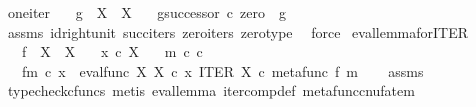 \begin{isabellebody}
\isanewline
{}\isamarkupfalse%
\ one{\isacharunderscore}{\kern0pt}iter{\isacharcolon}{\kern0pt}\isanewline
\ \ \ {\isachardoublequoteopen}g\ {\isacharcolon}{\kern0pt}\ X\ {\isasymrightarrow}\ X{\isachardoublequoteclose}\isanewline
\ \ \ {\isachardoublequoteopen}g\isactrlbsup {\isasymcirc}{\isacharparenleft}{\kern0pt}successor\ {\isasymcirc}\isactrlsub c\ zero{\isacharparenright}{\kern0pt}\isactrlesup \ {\isacharequal}{\kern0pt}\ g{\isachardoublequoteclose}\isanewline
%
\isadelimproof
\ \ %
\endisadelimproof
%
\isatagproof
{}\isamarkupfalse%
\ assms\ id{\isacharunderscore}{\kern0pt}right{\isacharunderscore}{\kern0pt}unit{}\ succ{\isacharunderscore}{\kern0pt}iters\ zero{\isacharunderscore}{\kern0pt}iters\ zero{\isacharunderscore}{\kern0pt}type\ \isamarkupfalse%
\ force%
\endisatagproof
{\isafoldproof}%
%
\isadelimproof
\isanewline
%
\endisadelimproof
\isanewline
{}\isamarkupfalse%
\ eval{\isacharunderscore}{\kern0pt}lemma{\isacharunderscore}{\kern0pt}for{\isacharunderscore}{\kern0pt}ITER{\isacharcolon}{\kern0pt}\isanewline
\ \ \ {\isachardoublequoteopen}f\ {\isacharcolon}{\kern0pt}\ X\ {\isasymrightarrow}\ X{\isachardoublequoteclose}\isanewline
\ \ \ {\isachardoublequoteopen}x\ {\isasymin}\isactrlsub c\ X{\isachardoublequoteclose}\isanewline
\ \ \ {\isachardoublequoteopen}m\ {\isasymin}\isactrlsub c\ {\isasymnat}\isactrlsub c{\isachardoublequoteclose}\isanewline
\ \ \ {\isachardoublequoteopen}{\isacharparenleft}{\kern0pt}f\isactrlbsup {\isasymcirc}m\isactrlesup {\isacharparenright}{\kern0pt}\ {\isasymcirc}\isactrlsub c\ x\ {\isacharequal}{\kern0pt}\ eval{\isacharunderscore}{\kern0pt}func\ X\ X\ {\isasymcirc}\isactrlsub c\ {\isasymlangle}x\ {\isacharcomma}{\kern0pt}ITER\ X\ {\isasymcirc}\isactrlsub c\ {\isasymlangle}metafunc\ f\ {\isacharcomma}{\kern0pt}m{\isasymrangle}{\isasymrangle}{\isachardoublequoteclose}\isanewline
%
\isadelimproof
\ \ %
\endisadelimproof
%
\isatagproof
{}\isamarkupfalse%
\ assms\ \isamarkupfalse%
\ {\isacharparenleft}{\kern0pt}typecheck{\isacharunderscore}{\kern0pt}cfuncs{\isacharcomma}{\kern0pt}\ metis\ eval{\isacharunderscore}{\kern0pt}lemma\ iter{\isacharunderscore}{\kern0pt}comp{\isacharunderscore}{\kern0pt}def{}\ metafunc{\isacharunderscore}{\kern0pt}cnufatem{\isacharparenright}{\kern0pt}%
\endisatagproof
{\isafoldproof}%
%
\isadelimproof
\isanewline
%
\endisadelimproof
\isanewline
{}\isamarkupfalse%

\end{isabellebody}
